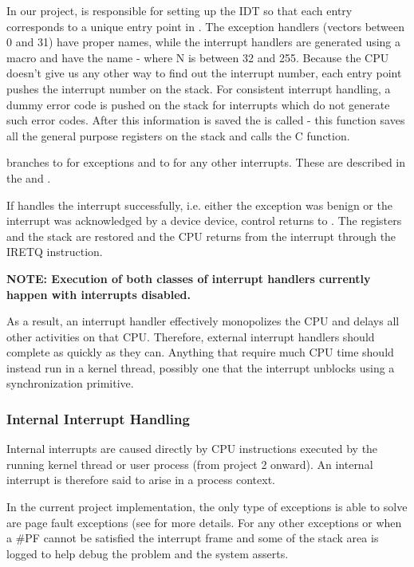 \begin{appendices}
In our project,  is responsible for setting up the IDT so that each entry
corresponds to a unique entry point in . The exception handlers (vectors between 0
and 31) have proper names, while the interrupt handlers are generated using a macro and have the
 name - where N is between 32 and 255. Because the CPU doesn’t give us any other
way to find out the interrupt number, each entry point pushes the interrupt number on the stack.
For consistent interrupt handling, a dummy error code is pushed on the stack for interrupts which
do not generate such error codes. After this information is saved the  is
 called - this function saves all the general purpose registers on the stack and calls the
 C function.

 branches to  for exceptions and to
 for any other interrupts. These are described in the
 and .

If  handles the interrupt successfully, i.e. either the exception was
benign or the interrupt was acknowledged by a device device, control returns to .
The registers and the stack are restored and the CPU returns from the interrupt through the IRETQ
instruction.

\textbf{NOTE: Execution of both classes of interrupt handlers currently happen with interrupts
disabled.}

As a result, an interrupt handler effectively monopolizes the CPU and delays all other activities on
that CPU. Therefore, external interrupt handlers should complete as quickly as they can. Anything
that require much CPU time should instead run in a kernel thread, possibly one that the interrupt
unblocks using a synchronization primitive.

\subsubsection{Internal Interrupt Handling}
\label{sect:IntInterrupt}

Internal interrupts are caused directly by CPU instructions executed by the running kernel thread or
user process (from project 2 onward). An internal interrupt is therefore said to arise in a
process context.

In the current project implementation, the only type of exceptions  is 
able to solve are page fault exceptions (see  for more details.
For any other exceptions or when a \#PF cannot be satisfied the interrupt frame and some of the
stack area is logged to help debug the problem and the system asserts.


\end{appendices}
